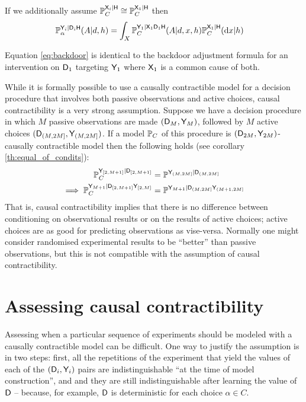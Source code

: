 If we additionally assume $\mathbb{P}_C^{\mathsf{X}_{i}|\mathsf{H}}\cong \mathbb{P}_C^{\mathsf{X}_{1}|\mathsf{H}}$ then 
\begin{align}
    \mathbb{P}_\alpha^{\mathsf{Y}_{i}|\mathsf{D}_{i}\mathsf{H}}(A|d,h) &= \int_X \mathbb{P}_C^{\mathsf{Y}_{1}|\mathsf{X}_{1}\mathsf{D}_{1}\mathsf{H}}(A|d,x,h)\mathbb{P}_C^{\mathsf{X}_{1}|\mathsf{H}}(\mathrm{d}x|h)\label{eq:backdoor}
\end{align}

Equation \ref{eq:backdoor} is identical to the backdoor adjustment formula for an intervention on $\mathsf{D}_1$ targeting $\mathsf{Y}_1$ where $\mathsf{X}_1$ is a common cause of both.

While it is formally possible to use a causally contractible model for a decision procedure that involves both passive observations and active choices, causal contractibility is a very strong assumption. Suppose we have a decision procedure in which $M$ passive observations are made $(\mathsf{D}_M,\mathsf{Y}_M)$, followed by $M$ active choices $(\mathsf{D}_{(M,2M]},\mathsf{Y}_{(M,2M]})$. If a model $\mathbb{P}_C$ of this procedure is $(\mathsf{D}_{2M},\mathsf{Y}_{2M})$-causally contractible model then the following holds (see corollary \ref{th:equal_of_condits}):
\begin{align}
    \mathbb{P}^{\mathsf{Y}_{[2,M+1]}|\mathsf{D}_{[2,M+1]}}_C &= \mathbb{P}^{\mathsf{Y}_{(M,2M]}|\mathsf{D}_{(M,2M]}}\\
    \implies \mathbb{P}^{\mathsf{Y}_{M+1}|\mathsf{D}_{[2,M+1]}\mathsf{Y}_{[2,M]}}_C &= \mathbb{P}^{\mathsf{Y}_{M+1}|\mathsf{D}_{(M,2M]}\mathsf{Y}_{(M+1,2M]}}
\end{align}
That is, causal contractibility implies that there is no difference between conditioning on observational results or on the results of active choices; active choices are as good for predicting observations as vise-versa. Normally one might consider randomised experimental results to be ``better'' than passive observations, but this is not compatible with the assumption of causal contractibility.

\section{Assessing causal contractibility}\label{sec:assessing}

Assessing when a particular sequence of experiments should be modeled with a causally contractible model can be difficult. One way to justify the assumption is in two steps: first, all the repetitions of the experiment that yield the values of each of the $(\mathsf{D}_i,\mathsf{Y}_i)$ pairs are indistinguishable ``at the time of model construction'', and and they are still indistinguishable after learning the value of $\mathsf{D}$ -- because, for example, $\mathsf{D}$ is deterministic for each choice $\alpha\in C$. 


